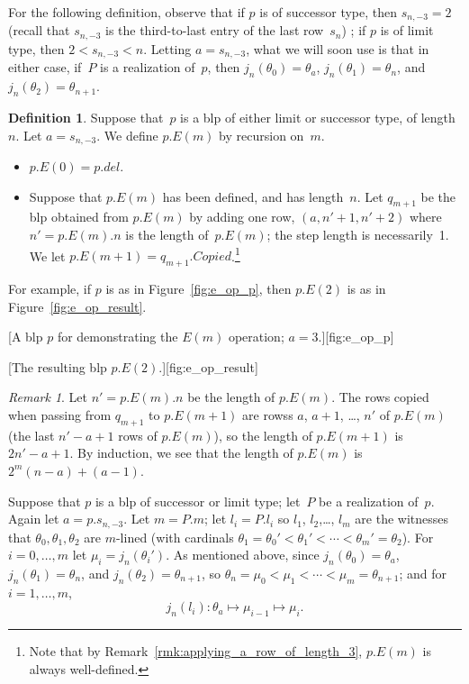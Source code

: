 \documentclass{article}
\theoremstyle{definition}
\newtheorem{definition}[lemma]{Definition}
\theoremstyle{remark}
\newtheorem{remark}[lemma]{Remark}
\begin{document}
For the following definition, observe that if $p$ is of successor type, then $s_{n,-3} = 2$ (recall that $s_{n,-3}$ is the third-to-last entry of the last row~$s_n$) ; if $p$ is of limit type, then $2<s_{n,-3}<n$. Letting $a = s_{n,-3}$, what we will soon use is that in either case, 
if~$P$ is a realization of~$p$, then $j_n(\theta_0) = \theta_a$, $j_n(\theta_1) = \theta_n$, and $j_n(\theta_2) = \theta_{n+1}$. 

\begin{definition} \label{def:operation_E}
  Suppose that~$p$ is a blp of either limit or successor type, of length~$n$.  Let $a=s_{n,-3}$. We define $p.E(m)$ by recursion on~$m$. 
  \begin{itemize}
    \item $p.E(0) = p.del$.

    \item Suppose that $p.E(m)$ has been defined, and has length~$n$. Let $q_{m+1}$ be the blp obtained from $p.E(m)$ by adding one row, $(a,n'+1,n'+2)$ where $n' = p.E(m).n$ is the length of~$p.E(m)$; the step length is necessarily~1. We let $p.E(m+1) = q_{m+1}.Copied$.\footnote{Note that by Remark~\ref{rmk:applying_a_row_of_length_3}, $p.E(m)$ is always well-defined.}
  \end{itemize}
\end{definition}


For example, if $p$ is as in Figure~\ref{fig:e_op_p}, then $p.E(2)$ is as in Figure~\ref{fig:e_op_result}. 

[A blp $p$ for demonstrating the $E(m)$ operation; $a=3$.][fig:e_op_p]

[The resulting blp $p.E(2)$.][fig:e_op_result]


\begin{remark} \label{rmk:the_length_of_the_E_blp}
   Let $n' = p.E(m).n$ be the length of $p.E(m)$. The rows copied when passing from $q_{m+1}$ to $p.E(m+1)$ are rowss $a$, $a+1$, \dots, $n'$ of $p.E(m)$ (the last $n'-a+1$ rows of $p.E(m)$), so the length of $p.E(m+1)$ is $2n' -a +1$. By induction, we see that the length of $p.E(m)$ is $2^m(n-a)+ (a-1)$. 
\end{remark}



\medskip

Suppose that $p$ is a blp of successor or limit type; let~$P$ be a realization of~$p$. Again let $a = p.s_{n,-3}$. Let $m = P.m$; let $l_i = P.l_i$ so $l_1$, $l_2$,\dots, $l_m$ are the witnesses that $\theta_0,\theta_1,\theta_2$ are $m$-lined (with cardinals $\theta_1 = \theta_0'<\theta_1'<\cdots <\theta_m'= \theta_2$). For $i=0,\dots, m$ let $\mu_i = j_n(\theta_i')$. As mentioned above, since $j_n(\theta_0) = \theta_a$, $j_n(\theta_1) = \theta_n$, and $j_n(\theta_2) = \theta_{n+1}$, so $\theta_n = \mu_0 <\mu_1 < \cdots <\mu_m = \theta_{n+1}$; and for $i=1,\dots, m$, 
\[
  j_n(l_i) \colon \theta_a \mapsto \mu_{i-1}\mapsto \mu_i. 
\]
\end{document}
